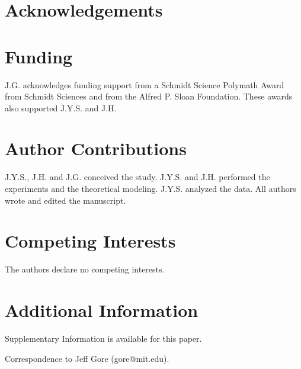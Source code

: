 
\section*{Acknowledgements}
\label{sec:acknowledgements}



\section*{Funding}
\label{sec:funding}

J.G. acknowledges funding support from a Schmidt Science Polymath Award from Schmidt Sciences and from the Alfred P. Sloan Foundation. These awards also supported J.Y.S. and J.H.



\section*{Author Contributions}
\label{sec:contributions}

J.Y.S., J.H. and J.G. conceived the study. J.Y.S. and J.H. performed the experiments and the theoretical modeling. J.Y.S. analyzed the data. All authors wrote and edited the manuscript.


\section*{Competing Interests}
\label{sec:competing}

The authors declare no competing interests.


\section*{Additional Information}
\label{sec:additional}

Supplementary Information is available for this paper.

\noindent Correspondence to Jeff Gore (gore@mit.edu).
